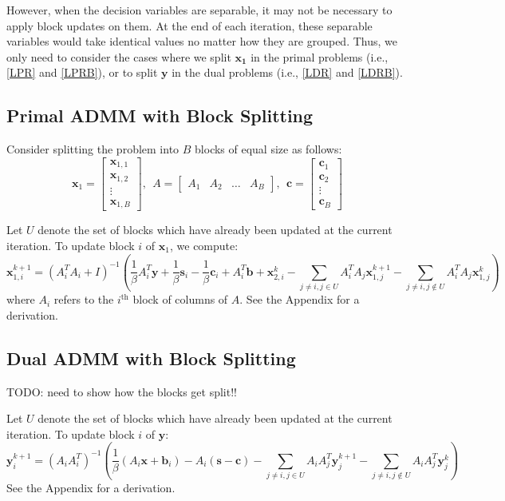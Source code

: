 \documentclass{article}
\begin{document}
However, when the decision variables are separable, it may not be necessary to apply block updates on them. At the end of each iteration, these separable variables would take identical values no matter how they are grouped. Thus, we only need to consider the cases where we split $\mathbf{x_1}$ in the primal problems (i.e.,  \eqref{LPR} and \eqref{LPRB}), or to split $\mathbf{y}$ in the dual problems (i.e.,  \eqref{LDR} and \eqref{LDRB}).

\subsection*{Primal ADMM with Block Splitting}

Consider splitting the problem into $B$ blocks of equal size as follows:
\[
\mathbf{x}_{1}=\begin{bmatrix}
\mathbf{x}_{1,1}\\
\mathbf{x}_{1,2}\\
\vdots \\
\mathbf{x}_{1,B}
\end{bmatrix},
 \ \  
A=\begin{bmatrix}A_{1} & A_{2} & \dots & A_{B} \end{bmatrix},
\ \ 
\mathbf{c}=\begin{bmatrix}
\mathbf{c}_{1}\\
\mathbf{c}_{2}\\
\vdots \\
\mathbf{c}_{B}
\end{bmatrix}
\]

Let $U$ denote the set of blocks which have already been updated at the current iteration. To update block $i$ of $\mathbf{x}_{1}$, we compute:
\[
\mathbf{x}_{1,i}^{k+1}=\left(A_{i}^{T}A_{i}+I\right)^{-1}\left(\frac{1}{\beta}A_{i}^{T}\mathbf{y}+\frac{1}{\beta}\mathbf{s}_{i}-\frac{1}{\beta}\mathbf{c}_{i}+A_{i}^{T}\mathbf{b}+\mathbf{x}_{2,i}^{k}-\sum_{j\neq i,j\in U}A_{i}^{T}A_{j}\mathbf{x}_{1,j}^{k+1}-\sum_{j\neq i,j\notin U}A_{i}^{T}A_{j}\mathbf{x}_{1,j}^{k}\right)
\]
where $A_{i}$ refers to the $i^{\text{th}}$ block of columns of $A$. See the Appendix for a derivation.

\subsection*{Dual ADMM with Block Splitting}

TODO: need to show how the blocks get split!!

Let $U$ denote the set of blocks which have already been updated at the current iteration. To update block $i$ of $\mathbf{y}$:
\[
\mathbf{y}_{i}^{k+1}=\left(A_{i}A_{i}^{T}\right)^{-1}\left(\frac{1}{\beta}\left(A_{i}\mathbf{x}+\mathbf{b}_{i}\right)-A_{i}\left(\mathbf{s}-\mathbf{c}\right)-\sum_{j\neq i,j\in U}A_{i}A_{j}^{T}\mathbf{y}_{j}^{k+1}-\sum_{j\neq i,j\notin U}A_{i}A_{j}^{T}\mathbf{y}_{j}^{k}\right)
\]
See the Appendix for a derivation.
\end{document}
